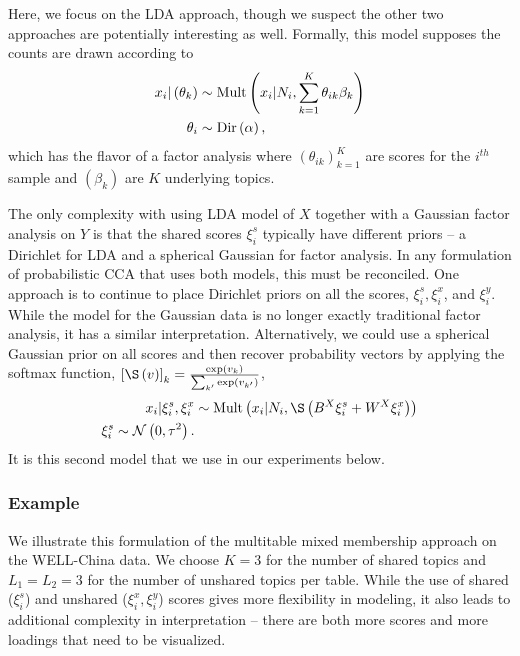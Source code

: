 \documentclass[14pt]{extarticle}
\begin{document}
Here, we focus on the LDA approach, though we suspect the other two approaches
are potentially interesting as well. Formally, this model supposes the counts
are drawn according to
\begin{align*}
  x_{i} \vert \left(\theta_{k}\right) &\sim \textnormal{Mult}\left(x_{i} \vert N_{i},
  \sum_{k = 1}^{K} \theta_{ik} \beta_{k}\right) \\
  \theta_{i} &\sim \textnormal{Dir}\left(\alpha\right),
\end{align*}
which has the flavor of a factor analysis where $\left(\theta_{ik}\right)_{k
  =1}^{K}$ are scores for the $i^{th}$ sample and $\left(\beta_{k}\right)$ are
$K$ underlying topics.

The only complexity with using LDA model of $X$ together with a Gaussian factor
analysis on $Y$ is that the shared scores $\xi_{i}^{s}$ typically have different
priors -- a Dirichlet for LDA and a spherical Gaussian for factor analysis. In
any formulation of probabilistic CCA that uses both models, this must be
reconciled. One approach is to continue to place Dirichlet priors on all the
scores, $\xi_{i}^s, \xi_{i}^x$, and $\xi_{i}^y$. While the model for the
Gaussian data is no longer exactly traditional factor analysis, it has a similar
interpretation. Alternatively, we could use a spherical Gaussian prior on all
scores and then recover probability vectors by applying the softmax function,
$\left[\S\left(v\right)\right]_{k} =
\frac{\exp{v_{k}}}{\sum_{k^{\prime}}\exp{v_{k^{\prime}}}}$,
\begin{align*}
  x_{i} \vert \xi_{i}^{s}, \xi_{i}^{x} &\sim \Mult\left(x_{i} \vert N_{i},
  \S\left(B^{X} \xi_{i}^{s} + W^{X} \xi_{i}^{x}\right)\right) \\
  \xi_{i}^{s} \sim \Gsn\left(0, \tau^{2}\right).
\end{align*}
It is this second model that we use in our experiments below.

\subsubsection{Example}
\label{subsubsec:lda_cca_example}

We illustrate this formulation of the multitable mixed membership approach on
the WELL-China data. We choose $K = 3$ for the number of shared topics and
$L_{1} = L_{2} = 3$ for the number of unshared topics per table. While the use
of shared ($\xi_{i}^{s}$) and unshared ($\xi_{i}^{x}, \xi_{i}^{y}$) scores gives
more flexibility in modeling, it also leads to additional complexity in
interpretation -- there are both more scores and more loadings that need to be
visualized.
\end{document}
